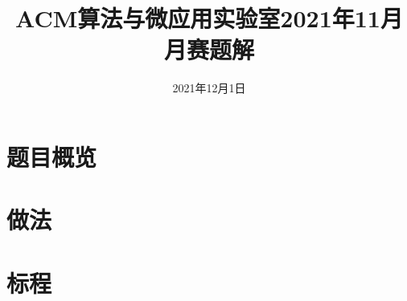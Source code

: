 \documentclass{ctsol}
\title{ACM算法与微应用实验室2021年11月月赛题解}
\date{2021年12月1日}
\begin{document}
\maketitle
{}

\section*{题目概览}
\solutiontab

\makesolution
\section*{做法}
\section*{标程}
\end{document}

